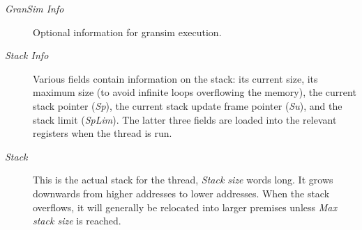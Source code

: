 \documentclass[11pt]{article}
\begin{document}
\begin{description}
% 
% 
% 

\item[\emph{GranSim Info}]
Optional information for gransim execution.

% 
% 
% 
% 

\item[\emph{Stack Info}] Various fields contain information on the
stack: its current size, its maximum size (to avoid infinite loops
overflowing the memory), the current stack pointer (\emph{Sp}), the
current stack update frame pointer (\emph{Su}), and the stack limit
(\emph{SpLim}).  The latter three fields are loaded into the relevant
registers when the thread is run.

\item[\emph{Stack}] This is the actual stack for the thread,
\emph{Stack size} words long.  It grows downwards from higher
addresses to lower addresses.  When the stack overflows, it will
generally be relocated into larger premises unless \emph{Max stack
size} is reached.

\end{description}
\end{document}
